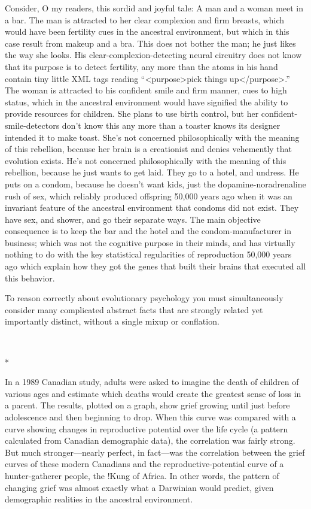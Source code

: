 {
 Consider, O my readers, this sordid and joyful tale: A man and a
woman meet in a bar. The man is attracted to her clear complexion and
firm breasts, which would have been fertility cues in the ancestral
environment, but which in this case result from makeup and a bra. This
does not bother the man; he just likes the way she looks. His
clear-complexion-detecting neural circuitry does not know that its
purpose is to detect fertility, any more than the atoms in his hand
contain tiny little XML tags reading
``{\textless}purpose{\textgreater}pick things
up{\textless}/purpose{\textgreater}.'' The woman is
attracted to his confident smile and firm manner, cues to high status,
which in the ancestral environment would have signified the ability to
provide resources for children. She plans to use birth control, but her
confident-smile-detectors don't know this any more than
a toaster knows its designer intended it to make toast.
She's not concerned philosophically with the meaning of
this rebellion, because her brain is a creationist and denies
vehemently that evolution exists. He's not concerned
philosophically with the meaning of this rebellion, because he just
wants to get laid. They go to a hotel, and undress. He puts on a
condom, because he doesn't want kids, just the
dopamine-noradrenaline rush of sex, which reliably produced offspring
50,000 years ago when it was an invariant feature of the ancestral
environment that condoms did not exist. They have sex, and shower, and
go their separate ways. The main objective consequence is to keep the
bar and the hotel and the condom-manufacturer in business; which was
not the cognitive purpose in their minds, and has virtually nothing to
do with the key statistical regularities of reproduction 50,000 years
ago which explain how they got the genes that built their brains that
executed all this behavior.}

{
 To reason correctly about evolutionary psychology you must
simultaneously consider many complicated abstract facts that are
strongly related yet importantly distinct, without a single mixup or
conflation.}

{\centering
 \ ~
\par}

{\centering
 *
\par}


{
 In a 1989 Canadian study, adults were asked to imagine the death
of children of various ages and estimate which deaths would create the
greatest sense of loss in a parent. The results, plotted on a graph,
show grief growing until just before adolescence and then beginning to
drop. When this curve was compared with a curve showing changes in
reproductive potential over the life cycle (a pattern calculated from
Canadian demographic data), the correlation was fairly strong. But much
stronger---nearly perfect, in fact---was the correlation between the
grief curves of these modern Canadians and the reproductive-potential
curve of a hunter-gatherer people, the !Kung of Africa. In other words,
the pattern of changing grief was almost exactly what a Darwinian would
predict, given demographic realities in the ancestral environment.}

